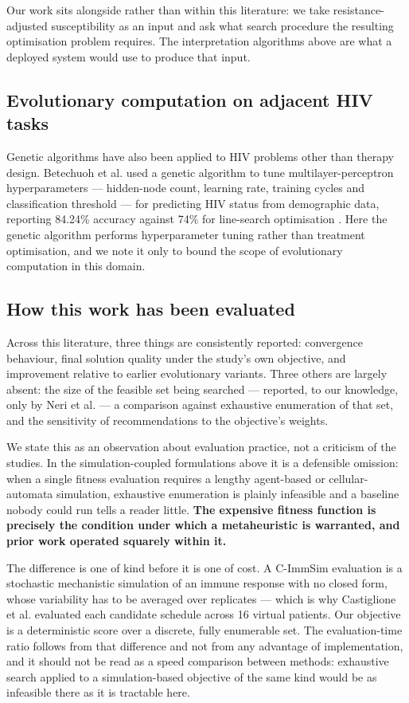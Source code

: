 \documentclass[conference]{IEEEtran}
\begin{document}
Our work sits alongside rather than within this literature: we take resistance-adjusted susceptibility as an input and ask what search procedure the resulting optimisation problem requires. The interpretation algorithms above are what a deployed system would use to produce that input.

\subsection{Evolutionary computation on adjacent HIV tasks}\label{sec:rw-adj}

Genetic algorithms have also been applied to HIV problems other than therapy design. Betechuoh et al. used a genetic algorithm to tune multilayer-perceptron hyperparameters --- hidden-node count, learning rate, training cycles and classification threshold --- for predicting HIV status from demographic data, reporting 84.24\% accuracy against 74\% for line-search optimisation \cite{betechuoh2006}. Here the genetic algorithm performs hyperparameter tuning rather than treatment optimisation, and we note it only to bound the scope of evolutionary computation in this domain.

\subsection{How this work has been evaluated}\label{sec:rw-eval}

Across this literature, three things are consistently reported: convergence behaviour, final solution quality under the study's own objective, and improvement relative to earlier evolutionary variants. Three others are largely absent: the size of the feasible set being searched --- reported, to our knowledge, only by Neri et al. \cite{neri2007tcbb} --- a comparison against exhaustive enumeration of that set, and the sensitivity of recommendations to the objective's weights.

We state this as an observation about evaluation practice, not a criticism of the studies. In the simulation-coupled formulations above it is a defensible omission: when a single fitness evaluation requires a lengthy agent-based or cellular-automata simulation, exhaustive enumeration is plainly infeasible and a baseline nobody could run tells a reader little. \textbf{The expensive fitness function is precisely the condition under which a metaheuristic is warranted, and prior work operated squarely within it.}

The difference is one of kind before it is one of cost. A C-ImmSim evaluation is a stochastic mechanistic simulation of an immune response with no closed form, whose variability has to be averaged over replicates --- which is why Castiglione et al. evaluated each candidate schedule across 16 virtual patients. Our objective is a deterministic score over a discrete, fully enumerable set. The evaluation-time ratio follows from that difference and not from any advantage of implementation, and it should not be read as a speed comparison between methods: exhaustive search applied to a simulation-based objective of the same kind would be as infeasible there as it is tractable here.
\end{document}
